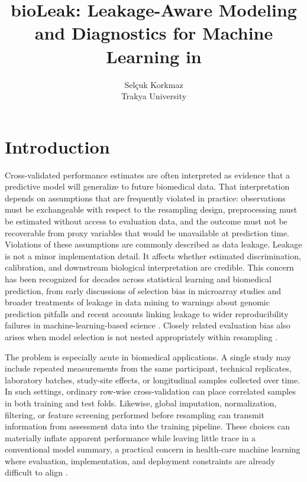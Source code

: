 \documentclass[article,shortnames]{jss}
\author{Selçuk Korkmaz\\Trakya University}
\title{bioLeak: Leakage-Aware Modeling and Diagnostics for Machine Learning in \proglang{R}}
\begin{document}


\section[Introduction]{Introduction}\label{sec:intro}

Cross-validated performance estimates are often interpreted as evidence that a predictive model will generalize to future biomedical data. That interpretation depends on assumptions that are frequently violated in practice: observations must be exchangeable with respect to the resampling design, preprocessing must be estimated without access to evaluation data, and the outcome must not be recoverable from proxy variables that would be unavailable at prediction time. Violations of these assumptions are commonly described as data leakage. Leakage is not a minor implementation detail. It affects whether estimated discrimination, calibration, and downstream biological interpretation are credible. This concern has been recognized for decades across statistical learning and biomedical prediction, from early discussions of selection bias in microarray studies \citep{ambroise2002} and broader treatments of leakage in data mining \citep{kaufman2012} to warnings about genomic prediction pitfalls \citep{simon2003, subramanian2013} and recent accounts linking leakage to wider reproducibility failures in machine-learning-based science \citep{kapoor2023}. Closely related evaluation bias also arises when model selection is not nested appropriately within resampling \citep{varma2006, cawley2010}.

The problem is especially acute in biomedical applications. A single study may include repeated measurements from the same participant, technical replicates, laboratory batches, study-site effects, or longitudinal samples collected over time. In such settings, ordinary row-wise cross-validation can place correlated samples in both training and test folds. Likewise, global imputation, normalization, filtering, or feature screening performed before resampling can transmit information from assessment data into the training pipeline. These choices can materially inflate apparent performance while leaving little trace in a conventional model summary, a practical concern in health-care machine learning where evaluation, implementation, and deployment constraints are already difficult to align \citep{beam2018, sendak2020}.
\end{document}
